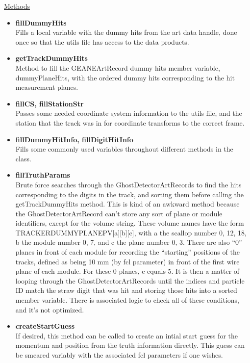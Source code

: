 \documentclass{article}
\begin{document}
\begin{enumerate}
      \underline{Methods}

        \begin{itemize}

          \item{\bf{fillDummyHits}} \\
          Fills a local variable with the dummy hits from the art data handle, done once so that the utils file has access to the data products.

          \item{\bf{getTrackDummyHits}} \\
          Method to fill the GEANEArtRecord dummy hits member variable, dummyPlaneHits, with the ordered dummy hits corresponding to the hit measurement planes.

          \item{\bf{fillCS, fillStationStr}} \\
          Passes some needed coordinate system information to the utils file, and the station that the track was in for coordinate transforms to the correct frame.

          \item{\bf{fillDummyHitInfo, fillDigitHitInfo}} \\
          Fills some commonly used variables throughout different methods in the class.

          \item{\bf{fillTruthParams}} \\
          Brute force searches through the GhostDetectorArtRecords to find the hits corresponding to the digits in the track, and sorting them before calling the getTrackDummyHits method. This is kind of an awkward method because the GhostDetectorArtRecord can't store any sort of plane or module identifiers, except for the volume string. These volume names have the form TRACKERDUMMYPLANEPV[a][b][c], with a the scallop number {0, 12, 18}, b the module number {0, 7}, and c the plane number {0, 3}. There are also ``0'' planes in front of each module for recording the ``starting'' positions of the tracks, defined as being 10 mm (by fcl parameter) in front of the first wire plane of each module. For these 0 planes, c equals 5. It is then a matter of looping through the GhostDetectorArtRecords until the indices and particle ID match the straw digit that was hit and storing those hits into a sorted member variable. There is associated logic to check all of these conditions, and it's not optimized.

          \item{\bf{createStartGuess}} \\
          If desired, this method can be called to create an intial start guess for the momentum and position from the truth information directly. This guess can be smeared variably with the associated fcl parameters if one wishes.


\end{itemize}
\end{enumerate}
\end{document}
